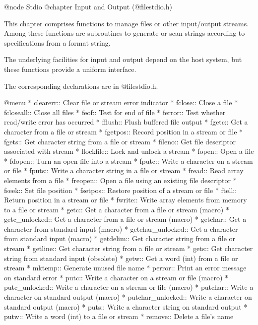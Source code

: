 @node Stdio
@chapter Input and Output (@file{stdio.h}) 

This chapter comprises functions to manage files
or other input/output streams. Among these functions are subroutines
to generate or scan strings according to specifications from a format string. 

The underlying facilities for input and output depend on the host
system, but these functions provide a uniform interface.

The corresponding declarations are in @file{stdio.h}.

@menu  
* clearerr::    Clear file or stream error indicator
* fclose::      Close a file
* fcloseall::   Close all files
* feof::        Test for end of file
* ferror::      Test whether read/write error has occurred
* fflush::      Flush buffered file output
* fgetc::       Get a character from a file or stream
* fgetpos::     Record position in a stream or file
* fgets::       Get character string from a file or stream
* fileno::      Get file descriptor associated with stream
* flockfile::   Lock and unlock a stream
* fopen::       Open a file
* fdopen::	Turn an open file into a stream
* fputc::       Write a character on a stream or file
* fputs::       Write a character string in a file or stream
* fread::       Read array elements from a file
* freopen::     Open a file using an existing file descriptor
* fseek::       Set file position
* fsetpos::     Restore position of a stream or file
* ftell::       Return position in a stream or file
* fwrite::      Write array elements from memory to a file or stream
* getc::        Get a character from a file or stream (macro)
* getc_unlocked::	Get a character from a file or stream (macro)
* getchar::     Get a character from standard input (macro)
* getchar_unlocked::	Get a character from standard input (macro)
* getdelim::    Get character string from a file or stream
* getline::     Get character string from a file or stream
* gets::        Get character string from standard input (obsolete)
* getw::        Get a word (int) from a file or stream
* mktemp::      Generate unused file name
* perror::      Print an error message on standard error
* putc::        Write a character on a stream or file (macro)
* putc_unlocked::	Write a character on a stream or file (macro)
* putchar::     Write a character on standard output (macro)
* putchar_unlocked::	Write a character on standard output (macro)
* puts::        Write a character string on standard output
* putw::        Write a word (int) to a file or stream
* remove::      Delete a file's name
